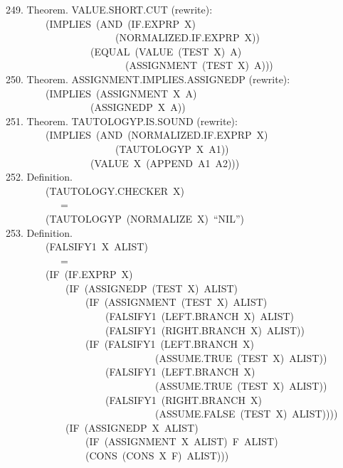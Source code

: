\documentclass[10pt]{book}
\newenvironment{pubasis}{\begin{flushleft}}{\end{flushleft}}
\begin{document}
\begin{pubasis}
249.    Theorem.  VALUE.SHORT.CUT (rewrite):\\
~~~~~~~~(IMPLIES~(AND~(IF.EXPRP~X)\\
~~~~~~~~~~~~~~~~~~~~~~(NORMALIZED.IF.EXPRP~X))\\
~~~~~~~~~~~~~~~~~(EQUAL~(VALUE~(TEST~X)~A)\\
~~~~~~~~~~~~~~~~~~~~~~~~(ASSIGNMENT~(TEST~X)~A)))\\

250.    Theorem.  ASSIGNMENT.IMPLIES.ASSIGNEDP (rewrite):\\
~~~~~~~~(IMPLIES~(ASSIGNMENT~X~A)\\
~~~~~~~~~~~~~~~~~(ASSIGNEDP~X~A))\\

251.    Theorem.  TAUTOLOGYP.IS.SOUND (rewrite):\\
~~~~~~~~(IMPLIES~(AND~(NORMALIZED.IF.EXPRP~X)\\
~~~~~~~~~~~~~~~~~~~~~~(TAUTOLOGYP~X~A1))\\
~~~~~~~~~~~~~~~~~(VALUE~X~(APPEND~A1~A2)))\\

252.    Definition.\\
~~~~~~~~(TAUTOLOGY.CHECKER~X)\\
~~~~~~~~~~~=\\
~~~~~~~~(TAUTOLOGYP~(NORMALIZE~X)~``NIL'')\\

253.    Definition.\\
~~~~~~~~(FALSIFY1~X~ALIST)\\
~~~~~~~~~~~=\\
~~~~~~~~(IF~(IF.EXPRP~X)\\
~~~~~~~~~~~~(IF~(ASSIGNEDP~(TEST~X)~ALIST)\\
~~~~~~~~~~~~~~~~(IF~(ASSIGNMENT~(TEST~X)~ALIST)\\
~~~~~~~~~~~~~~~~~~~~(FALSIFY1~(LEFT.BRANCH~X)~ALIST)\\
~~~~~~~~~~~~~~~~~~~~(FALSIFY1~(RIGHT.BRANCH~X)~ALIST))\\
~~~~~~~~~~~~~~~~(IF~(FALSIFY1~(LEFT.BRANCH~X)\\
~~~~~~~~~~~~~~~~~~~~~~~~~~~~~~(ASSUME.TRUE~(TEST~X)~ALIST))\\
~~~~~~~~~~~~~~~~~~~~(FALSIFY1~(LEFT.BRANCH~X)\\
~~~~~~~~~~~~~~~~~~~~~~~~~~~~~~(ASSUME.TRUE~(TEST~X)~ALIST))\\
~~~~~~~~~~~~~~~~~~~~(FALSIFY1~(RIGHT.BRANCH~X)\\
~~~~~~~~~~~~~~~~~~~~~~~~~~~~~~(ASSUME.FALSE~(TEST~X)~ALIST))))\\
~~~~~~~~~~~~(IF~(ASSIGNEDP~X~ALIST)\\
~~~~~~~~~~~~~~~~(IF~(ASSIGNMENT~X~ALIST)~F~ALIST)\\
~~~~~~~~~~~~~~~~(CONS~(CONS~X~F)~ALIST)))\\


\end{pubasis}
\end{document}
